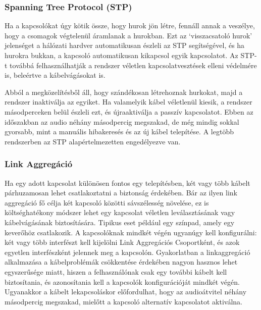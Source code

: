 \subsubsection{Spanning Tree Protocol (STP)}
Ha a kapcsolókat úgy kötik össze, hogy hurok jön létre, fennáll annak a veszélye, 
hogy a csomagok végtelenül áramlanak a hurokban. 
Ezt az `visszacsatoló hurok' jelenséget a hálózati hardver automatikusan észleli az
STP segítségével, és ha hurokra bukkan, a kapcsoló automatikusan kikapcsol egyik
kapcsolatot. Az STP-t továbbá felhasználhatják a rendszer véletlen
kapcsolatvesztések elleni védelmére is, beleértve a kábelvágásokat is. 

Abból a  megközelítésből áll, hogy szándékosan létrehoznak hurkokat, majd a rendszer
inaktiválja az egyiket. Ha valamelyik kábel véletlenül kiesik, a rendszer
másodperceken belül észleli ezt, és újraaktiválja a passzív kapcsolatot. Ebben
az időszakban az audio néhány másodpercig megszakad, de még mindig sokkal
gyorsabb, mint a manuális hibakeresés és az új kábel telepítése. 
A legtöbb rendszerben az STP alapértelmezetten engedélyezve van. 
\subsubsection{Link Aggregáció}
Ha egy adott kapcsolat különösen fontos egy telepítésben, két vagy több kábelt párhuzamosan
lehet csatlakoztatni a biztonság érdekében. 
Bár az ilyen link aggregáció fő célja két kapcsoló közötti sávszélesség növelése, 
ez is költséghatékony módszer lehet egy kapcsolat véletlen leválasztásának
vagy kábelvágásának biztosítására. Tipikus eset például egy színpad, amely egy keverőhöz
csatlakozik. A kapcsolóknak mindkét végén ugyanúgy kell konfigurálni: két vagy
több interfészt kell kijelölni Link Aggregációs Csoportként, és azok
egyetlen interfészként jelennek meg a kapcsolón. Gyakorlatban a linkaggregáció
alkalmazása a kábelproblémák csökkentése érdekében nagyon hasznos lehet
egyszerűsége miatt, hiszen a felhasználónak csak egy további kábelt kell
biztosítania, és azonosítania kell a kapcsolók konfigurációját mindkét végén.
Ugyanakkor a kábelt lekapcsoláskor előfordulhat, hogy az audioátvitel
néhány másodpercig megszakad, mielőtt a kapcsoló alternatív kapcsolatot
aktiválna.

